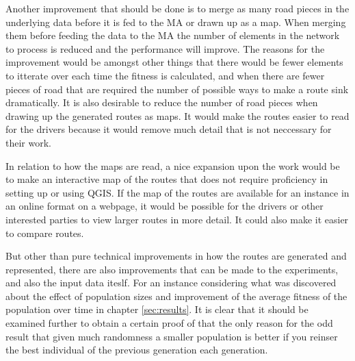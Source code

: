 Another improvement that should be done is to merge as many road pieces in the underlying data before it is fed to the MA or drawn up as a map. When merging them before feeding the data to the MA the number of elements in the network to process is reduced and the performance will improve. The reasons for the improvement would be amongst other things that there would be fewer elements to itterate over each time the fitness is calculated, and when there are fewer pieces of road that are required the number of possible ways to make a route sink dramatically. It is also desirable to reduce the number of road pieces when drawing up the generated routes as maps. It would make the routes easier to read for the drivers because it would remove much detail that is not neccessary for their work.

In relation to how the maps are read, a nice expansion upon the work would be to make an interactive map of the routes that does not require proficiency in setting up or using QGIS. If the map of the routes are available for an instance in an online format on a webpage, it would be possible for the drivers or other interested parties to view larger routes in more detail. It could also make it easier to compare routes.

But other than pure technical improvements in how the routes are generated and represented, there are also improvements that can be made to the experiments, and also the input data iteslf. For an instance considering what was discovered about the effect of population sizes and improvement of the average fitness of the population over time in chapter \ref{sec:results}. It is clear that it should be examined further to obtain a certain proof of that the only reason for the odd result that given much randomness a smaller population is better if you reinser the best individual of the previous generation each generation.









\cleardoublepage
